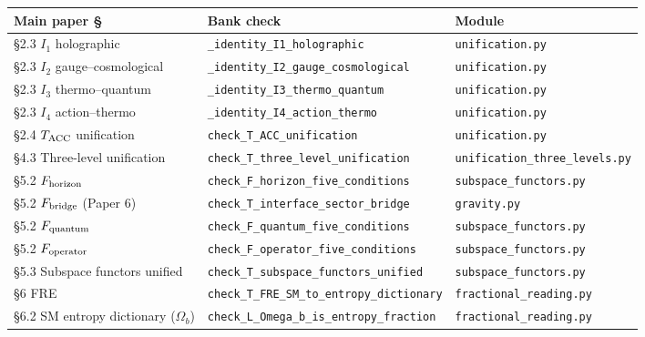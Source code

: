 \documentclass[11pt]{article}
\theoremstyle{plain}
\theoremstyle{definition}
\theoremstyle{remark}
\begin{document}
\begin{table}[h]
\centering
\footnotesize
\setlength{\tabcolsep}{4pt}
\begin{tabularx}{\textwidth}{@{}l X l@{}}
\toprule
\textbf{Main paper \S} & \textbf{Bank check} & \textbf{Module} \\
\midrule
\S2.3 $I_1$ holographic                  & \texttt{\_identity\_I1\_holographic}                    & \texttt{unification.py} \\
\S2.3 $I_2$ gauge--cosmological          & \texttt{\_identity\_I2\_gauge\_cosmological}            & \texttt{unification.py} \\
\S2.3 $I_3$ thermo--quantum              & \texttt{\_identity\_I3\_thermo\_quantum}                & \texttt{unification.py} \\
\S2.3 $I_4$ action--thermo               & \texttt{\_identity\_I4\_action\_thermo}                 & \texttt{unification.py} \\
\S2.4 $T_{\rm ACC}$ unification          & \texttt{check\_T\_ACC\_unification}                     & \texttt{unification.py} \\
\addlinespace[2pt]
\S4.3 Three-level unification            & \texttt{check\_T\_three\_level\_unification}            & \texttt{unification\_three\_levels.py} \\
\addlinespace[2pt]
\S5.2 $F_{\rm horizon}$                  & \texttt{check\_F\_horizon\_five\_conditions}            & \texttt{subspace\_functors.py} \\
\S5.2 $F_{\rm bridge}$ (Paper 6)         & \texttt{check\_T\_interface\_sector\_bridge}            & \texttt{gravity.py} \\
\S5.2 $F_{\rm quantum}$                  & \texttt{check\_F\_quantum\_five\_conditions}            & \texttt{subspace\_functors.py} \\
\S5.2 $F_{\rm operator}$                 & \texttt{check\_F\_operator\_five\_conditions}           & \texttt{subspace\_functors.py} \\
\S5.3 Subspace functors unified          & \texttt{check\_T\_subspace\_functors\_unified}          & \texttt{subspace\_functors.py} \\
\addlinespace[2pt]
\S6 FRE                                   & \texttt{check\_T\_FRE\_SM\_to\_entropy\_dictionary}     & \texttt{fractional\_reading.py} \\
\S6.2 SM entropy dictionary ($\Omega_b$)  & \texttt{check\_L\_Omega\_b\_is\_entropy\_fraction}      & \texttt{fractional\_reading.py} \\

\end{tabularx}
\end{table}
\end{document}

